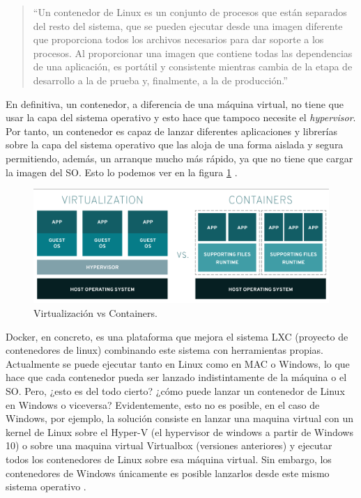 \begin{quote}

  \small ``Un contenedor de Linux es un conjunto de procesos que están
  separados del resto del sistema, que se pueden ejecutar desde una imagen
  diferente que proporciona todos los archivos necesarios para dar soporte
  a los procesos. Al proporcionar una imagen que contiene todas las
  dependencias de una aplicación, es portátil y consistente mientras cambia
  de la etapa de desarrollo a la de prueba y, finalmente, a la de
  producción.''\cite{Dck-7}

\end{quote}

En definitiva, un contenedor, a diferencia de una máquina virtual, no tiene
que usar la capa del sistema operativo y esto hace que tampoco necesite el
{\em hypervisor}. Por tanto, un contenedor es capaz de lanzar diferentes
aplicaciones y librerías sobre la capa del sistema operativo que las aloja
de una forma aislada y segura permitiendo, además, un arranque mucho más
rápido, ya que no tiene que cargar la imagen del SO. Esto lo podemos ver en
la figura \ref{dock-1} \cite{Dck-7}.

\begin{figure}[htp]
\centering
\includegraphics[scale=0.45]{Imagenes/dockervsvm1.png}
\caption{Virtualización vs Containers.}
\label{dock-1}
\end{figure}

Docker, en concreto, es una plataforma que mejora el sistema LXC (proyecto
de contenedores de linux) combinando este sistema con herramientas propias.
Actualmente se puede ejecutar tanto en Linux como en MAC o Windows, lo que
hace que cada contenedor pueda ser lanzado indistintamente de la máquina o
el SO. Pero, ¿esto es del todo cierto? ¿cómo puede lanzar un contenedor de
Linux en Windows o viceversa? Evidentemente, esto no es posible, en el caso
de Windows, por ejemplo, la solución consiste en lanzar una maquina virtual
con un kernel de Linux sobre el Hyper-V (el hypervisor de windows a partir
de Windows 10) o sobre una maquina virtual Virtualbox (versiones
anteriores) y ejecutar todos los contenedores de Linux sobre esa máquina
virtual. Sin embargo, los contenedores de Windows únicamente es posible
lanzarlos desde este mismo sistema operativo \cite{Dck-10}.

